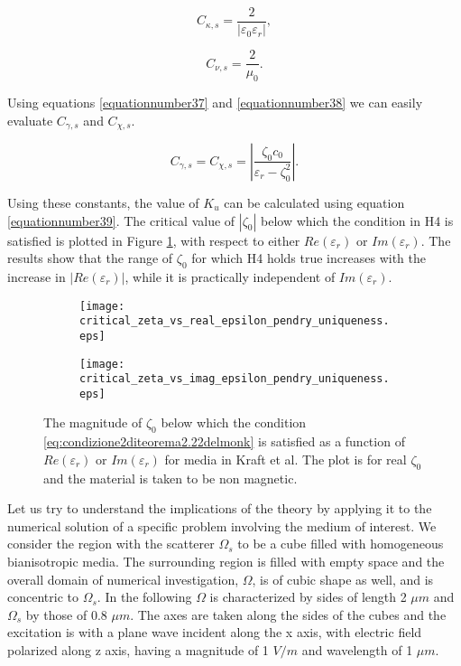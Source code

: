 \begin{equation} \label{eq:cks_pendry}
C_{\kappa,s} =  \frac{2}{|\varepsilon_0\varepsilon_r|},
\end{equation}

\begin{equation} \label{eq:cnus_pendry}
C_{\nu,s} = \frac{2}{\mu_0}. 
\end{equation}

Using equations \eqref{equationnumber37} and \eqref{equationnumber38} 
we can easily evaluate $C_{\gamma,s}$ and $C_{\chi,s}$. 

\begin{equation}
C_{\gamma,s} =  C_{\chi,s} = |\frac{\zeta_0c_0}{\varepsilon_r - \zeta_0^2}|. 
\end{equation}

Using these constants, the value of $K_u$  can be calculated using equation \eqref{equationnumber39}.
The critical value of $|\zeta_0|$ below which the condition in H4 is satisfied is plotted in Figure \ref{fi:critical_zeta_vs_epsilonr_uniqueness}, 
with respect to either $Re(\varepsilon_r)$ or $Im(\varepsilon_r)$.
The results show that the range of $\zeta_0$ for which H4 holds true increases with the increase in $|Re(\varepsilon_r)|$, 
while it is practically independent of $Im(\varepsilon_r)$.

\begin{figure}[H]
\centering
\begin{subfigure}[b]{0.49\textwidth}
\texttt{[image: critical\_zeta\_vs\_real\_epsilon\_pendry\_uniqueness.eps]}
\end{subfigure}
%
\begin{subfigure}[b]{0.49\textwidth}
\centering
\texttt{[image: critical\_zeta\_vs\_imag\_epsilon\_pendry\_uniqueness.eps]}
\end{subfigure}
\caption{The magnitude of $\zeta_0$ below which the condition \ref{eq:condizione2diteorema2.22delmonk} is satisfied as a function of $Re(\varepsilon_r)$ or $Im(\varepsilon_r)$ for media in Kraft et al.
The plot is for real $\zeta_0$ and the material is taken to be non magnetic.}
\label{fi:critical_zeta_vs_epsilonr_uniqueness}
\end{figure}

Let us try to understand the implications of the theory by applying it to 
the numerical solution of a specific problem involving the medium of interest.
We consider the region with the scatterer $\Omega_{s}$ to be a cube filled 
with homogeneous bianisotropic media.
The surrounding region is filled with empty space and the overall domain 
of numerical investigation, $\Omega$, is of cubic shape as well, and is 
concentric to $\Omega_{s}$.
In the following $\Omega$ is characterized by sides of length 2 $\mu m$ 
and $\Omega_s$ by those of 0.8 $\mu m$.
The axes are taken along the sides of the cubes and the excitation is 
with a plane wave incident along the x axis, with electric field polarized along 
z axis, having a magnitude of 1 $V/m$ and wavelength of 1 $\mu m$.

